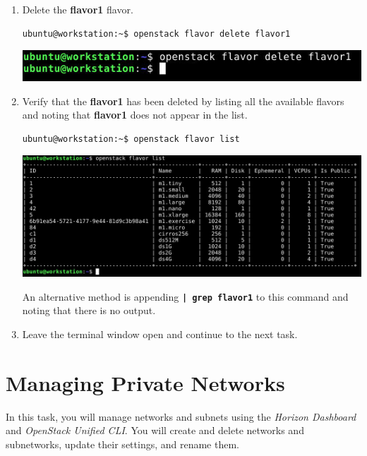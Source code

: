 \documentclass[letterpaper, 12pt]{article}
\begin{document}
\begin{enumerate}
    \item Delete the \textbf{flavor1} flavor.
\begin{lstlisting}
ubuntu@workstation:~$ openstack flavor delete flavor1
\end{lstlisting}

    \begin{center}
        \includegraphics[width=\linewidth]{images/part2/step8.png}
    \end{center}

    \item Verify that the \textbf{flavor1} has been deleted by listing all the available flavors and noting that
    \textbf{flavor1} does not appear in the list.
\begin{lstlisting}
ubuntu@workstation:~$ openstack flavor list    
\end{lstlisting}

    \begin{center}
        \includegraphics[width=\linewidth]{images/part2/step9.png}
    \end{center}

    \begin{tipbox}{}
        An alternative method is appending \textbf{\texttt{| grep flavor1}} to this command and noting that there is no
        output.
    \end{tipbox}

    \item Leave the terminal window open and continue to the next task.
\end{enumerate}

\section{Managing Private Networks}
\label{sec:managing_private_networks}
In this task, you will manage networks and subnets using the \textit{Horizon Dashboard} and \textit{OpenStack
Unified CLI}. You will create and delete networks and subnetworks, update their settings, and rename them.
\end{document}
